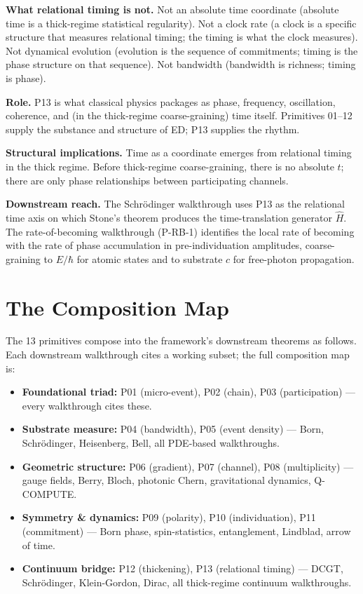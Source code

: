 \documentclass[11pt,a4paper]{article}
\begin{document}
\textbf{What relational timing is not.} Not an absolute time coordinate (absolute time is a thick-regime statistical regularity). Not a clock rate (a clock is a specific structure that measures relational timing; the timing is what the clock measures). Not dynamical evolution (evolution is the sequence of commitments; timing is the phase structure on that sequence). Not bandwidth (bandwidth is richness; timing is phase).

\textbf{Role.} P13 is what classical physics packages as phase, frequency, oscillation, coherence, and (in the thick-regime coarse-graining) time itself. Primitives 01--12 supply the substance and structure of ED; P13 supplies the rhythm.

\textbf{Structural implications.} Time as a coordinate emerges from relational timing in the thick regime. Before thick-regime coarse-graining, there is no absolute $t$; there are only phase relationships between participating channels.

\textbf{Downstream reach.} The Schr\"odinger walkthrough uses P13 as the relational time axis on which Stone's theorem produces the time-translation generator $\hat H$. The rate-of-becoming walkthrough (P-RB-1) identifies the local rate of becoming with the rate of phase accumulation in pre-individuation amplitudes, coarse-graining to $E/\hbar$ for atomic states and to substrate $c$ for free-photon propagation.

\section{The Composition Map}

The 13 primitives compose into the framework's downstream theorems as follows. Each downstream walkthrough cites a working subset; the full composition map is:

\begin{itemize}[noitemsep]
\item \textbf{Foundational triad:} P01 (micro-event), P02 (chain), P03 (participation) --- every walkthrough cites these.
\item \textbf{Substrate measure:} P04 (bandwidth), P05 (event density) --- Born, Schr\"odinger, Heisenberg, Bell, all PDE-based walkthroughs.
\item \textbf{Geometric structure:} P06 (gradient), P07 (channel), P08 (multiplicity) --- gauge fields, Berry, Bloch, photonic Chern, gravitational dynamics, Q-COMPUTE.
\item \textbf{Symmetry \& dynamics:} P09 (polarity), P10 (individuation), P11 (commitment) --- Born phase, spin-statistics, entanglement, Lindblad, arrow of time.
\item \textbf{Continuum bridge:} P12 (thickening), P13 (relational timing) --- DCGT, Schr\"odinger, Klein-Gordon, Dirac, all thick-regime continuum walkthroughs.
\end{itemize}
\end{document}
